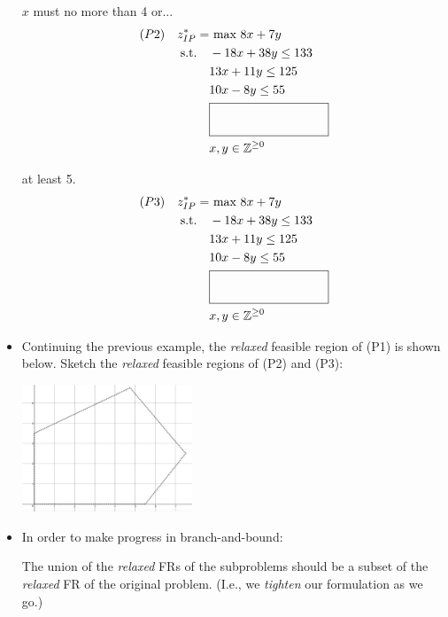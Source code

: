 \documentclass[11pt]{article}
\theoremstyle{definition}
\newcommand{\answerbox}[3]{%
  \fbox{%
    \begin{minipage}[#1]{#2}
      \hfill\vspace{#3}
    \end{minipage}
  }
}
\newcommand{\wordbox}{\answerbox{c}{1.2in}{.7cm}}
\begin{document}
\begin{itemize}
\begin{minipage}{0.5\textwidth}
\hspace{1.3cm}$x$ must no more than 4 or...
    \begin{align*}
    (P2) ~~~ z_{IP}^* = & \text{ max } 8x + 7y\\
      \text{s.t.} \quad & -18x + 38y \leq 133\\
                       & 13x + 11y \leq 125\\
                       & 10x -    8y \leq 55\\
                       & \wordbox \\
                       & x, y \in \mathbb{Z}^{\geq 0}
    \end{align*}
\end{minipage}
\begin{minipage}{0.5\textwidth}
\hspace{1.3cm}at least 5.
    \begin{align*}
    (P3) ~~~ z_{IP}^* = & \text{ max } 8x + 7y\\
      \text{s.t.} \quad & -18x + 38y \leq 133\\
                       & 13x + 11y \leq 125\\
                       & 10x -    8y \leq 55\\
                       & \wordbox \\
                       & x, y \in \mathbb{Z}^{\geq 0}
    \end{align*}
\end{minipage}


\newpage
\item Continuing the previous example, the \emph{relaxed} feasible region of (P1) is shown below.
Sketch the \emph{relaxed} feasible regions of (P2) and (P3):

\includegraphics[width=0.4\textwidth]{fr} 


\item  In order to make progress in branch-and-bound: 

The union of the \emph{relaxed} FRs of the subproblems should be a \wordbox subset of the \emph{relaxed} FR of the original problem.  (I.e., we \emph{tighten} our formulation as we go.)

\end{itemize}
\end{document}
